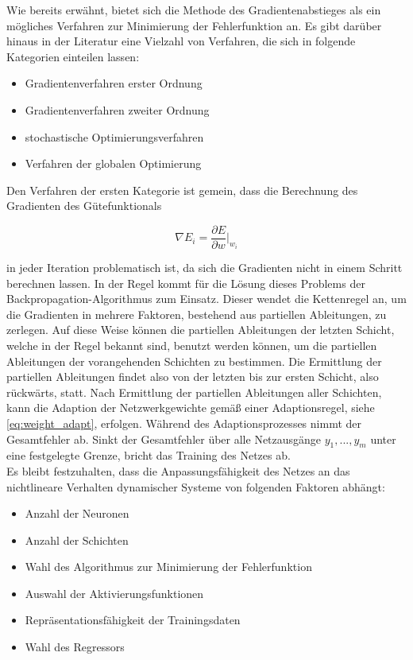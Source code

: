 Wie bereits erwähnt, bietet sich die Methode des Gradientenabstieges als ein mögliches Verfahren zur Minimierung der Fehlerfunktion an. Es gibt darüber hinaus in der Literatur eine Vielzahl von Verfahren, die sich in folgende Kategorien einteilen lassen:

\begin{itemize}
	\item Gradientenverfahren erster Ordnung
	\item Gradientenverfahren zweiter Ordnung
	\item stochastische Optimierungsverfahren
	\item Verfahren der globalen Optimierung
\end{itemize}


Den Verfahren der ersten Kategorie ist gemein, dass die Berechnung des Gradienten des Gütefunktionals

\begin{equation}
\nabla E_i = \dfrac{\partial E}{\partial w}\bigg|_{w_i}
\end{equation}

in jeder Iteration problematisch ist, da sich die Gradienten nicht in einem Schritt berechnen lassen. In der Regel kommt für die Lösung dieses Problems der Backpropagation-Algorithmus zum Einsatz. Dieser wendet die Kettenregel an, um die Gradienten in mehrere Faktoren, bestehend aus partiellen Ableitungen, zu zerlegen. Auf diese Weise können die partiellen Ableitungen der letzten Schicht, welche in der Regel bekannt sind, benutzt werden können, um die partiellen Ableitungen der vorangehenden Schichten zu bestimmen. 
Die Ermittlung der partiellen Ableitungen findet also von der letzten bis zur ersten Schicht, also rückwärts, statt. Nach Ermittlung der partiellen Ableitungen aller Schichten, kann die Adaption der Netzwerkgewichte gemäß einer Adaptionsregel, siehe \ref{eq:weight_adapt}, erfolgen. Während des Adaptionsprozesses nimmt der Gesamtfehler ab. Sinkt der Gesamtfehler über alle Netzausgänge $y_1,...,y_m$ unter eine festgelegte Grenze, bricht das Training des Netzes ab. \\

Es bleibt festzuhalten, dass die Anpassungsfähigkeit des Netzes an das nichtlineare Verhalten dynamischer Systeme von folgenden Faktoren abhängt:

\begin{itemize}
	\item Anzahl der Neuronen
	\item Anzahl der Schichten
	\item Wahl des Algorithmus zur Minimierung der Fehlerfunktion
	\item Auswahl der Aktivierungsfunktionen
	\item Repräsentationsfähigkeit der Trainingsdaten
	\item Wahl des Regressors
	
\end{itemize}



